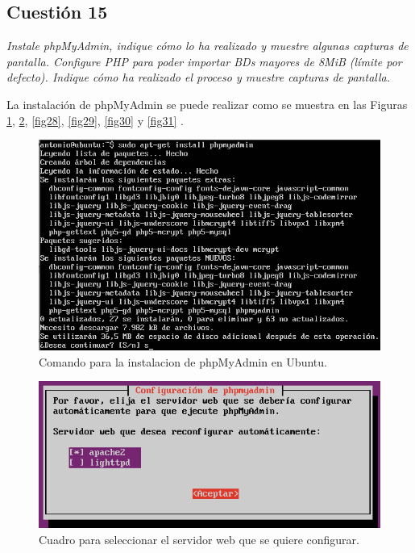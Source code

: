 \subsection{Cuestión 15}
\textit{Instale phpMyAdmin, indique cómo lo ha realizado y muestre algunas capturas de pantalla. Configure PHP para poder importar BDs mayores de 8MiB (límite por defecto). Indique cómo ha realizado el proceso y muestre capturas de pantalla.}
\newline

La instalación de phpMyAdmin se puede realizar como se muestra en las Figuras \ref{fig26}, \ref{fig27}, \ref{fig28}, \ref{fig29}, \ref{fig30} y \ref{fig31} . \cite{pma1}

\begin{figure}[H]
    \begin{center}
        \includegraphics[scale=0.5]{imagenes/img29}
        \caption{Comando para la instalacion de phpMyAdmin en Ubuntu.}
        \label{fig26}
    \end{center}
\end{figure}

\begin{figure}[H]
    \begin{center}
        \includegraphics[scale=0.5]{imagenes/img30}
        \caption{Cuadro para seleccionar el servidor web que se quiere configurar.}
        \label{fig27}
    \end{center}
\end{figure}

